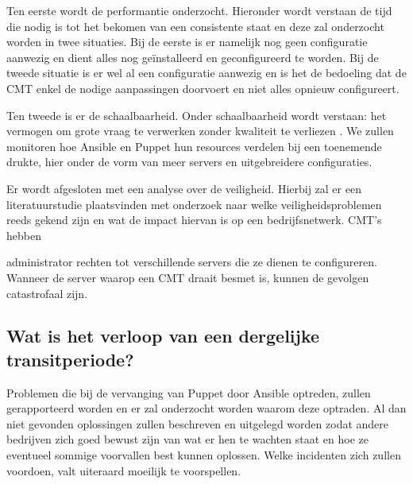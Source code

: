  Ten eerste wordt de performantie onderzocht. Hieronder wordt verstaan de tijd die nodig is tot het bekomen van een consistente staat en deze zal onderzocht worden in twee situaties. Bij de eerste is er namelijk nog geen configuratie aanwezig en dient alles nog ge\"installeerd en geconfigureerd te worden. Bij de tweede situatie is er wel al een configuratie aanwezig en is het de bedoeling dat de \gls{CMT} enkel de nodige aanpassingen doorvoert en niet alles opnieuw configureert. 

Ten tweede is er de schaalbaarheid. Onder schaalbaarheid wordt verstaan: het vermogen om grote vraag te verwerken zonder kwaliteit te verliezen \autocite{informit}. We zullen monitoren hoe Ansible en Puppet hun resources verdelen bij een toenemende drukte, hier onder de vorm van meer servers en uitgebreidere configuraties. 

Er wordt afgesloten met een analyse over de veiligheid. Hierbij zal er een literatuurstudie plaatsvinden met onderzoek naar welke veiligheidsproblemen reeds gekend zijn en wat de impact hiervan is op een bedrijfsnetwerk. \gls{CMT}'s hebben 






 administrator rechten tot verschillende servers die ze dienen te configureren. Wanneer de server waarop een \gls{CMT} draait besmet is, kunnen de gevolgen catastrofaal zijn.

\subsection{Wat is het verloop van een dergelijke transitperiode?}

Problemen die bij de vervanging van Puppet door Ansible optreden, zullen gerapporteerd worden en er zal onderzocht worden waarom deze optraden. Al dan niet gevonden oplossingen zullen beschreven en uitgelegd worden zodat andere bedrijven zich goed bewust zijn van wat er hen te wachten staat en hoe ze eventueel sommige voorvallen best kunnen oplossen. Welke incidenten zich zullen voordoen, valt uiteraard moeilijk te voorspellen. 




